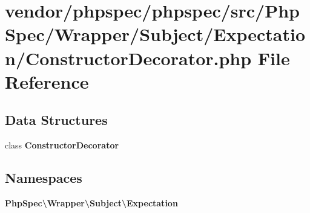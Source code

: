 \section{vendor/phpspec/phpspec/src/\+Php\+Spec/\+Wrapper/\+Subject/\+Expectation/\+Constructor\+Decorator.php File Reference}
\label{_constructor_decorator_8php}
\subsection*{Data Structures}
\begin{DoxyCompactItemize}
\item 
class {\bf Constructor\+Decorator}
\end{DoxyCompactItemize}
\subsection*{Namespaces}
\begin{DoxyCompactItemize}
\item 
 {\bf Php\+Spec\textbackslash{}\+Wrapper\textbackslash{}\+Subject\textbackslash{}\+Expectation}
\end{DoxyCompactItemize}
